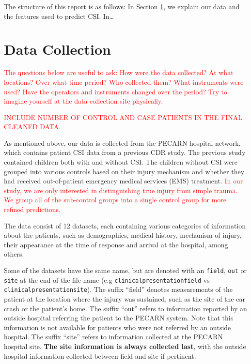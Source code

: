 \documentclass[
]{article}
\begin{document}
The structure of this report is as follows: In Section
\textcolor{blue}{\ref{sec:data}}, we explain our data and the features
used to predict CSI. In\ldots{}

\hypertarget{sec:data}{%
\section{Data Collection}\label{sec:data}}

\textcolor{red}{The questions below are useful to ask: How were the data collected? At what locations? Over what time period? Who collected them? What instruments were used? Have the operators and instruments changed over the period? Try to imagine yourself at the data collection site physically.}

\textcolor{red}{INCLUDE NUMBER OF CONTROL AND CASE PATIENTS IN THE FINAL CLEANED DATA.}

As mentioned above, our data is collected from the PECARN hospital
network, which contains patient CSI data from a previous CDR study. The
previous study contained children both with and without CSI. The
children without CSI were grouped into various controls based on their
injury mechanism and whether they had received out-of-patient emergency
medical services (EMS) treatment.
\textcolor{red}{In our study, we are only interested in distinguishing true injury from simple trauma. We group all of the sub-control groups into a single control group for more refined predictions.}

The data consist of 12 datasets, each containing various categories of
information about the patients, such as demographics, medical history,
mechanism of injury, their appearance at the time of response and
arrival at the hospital, among others.

Some of the datasets have the same name, but are denoted with an
\texttt{field}, \texttt{out} or \texttt{site} at the end of the file
name (e.g \texttt{clinicalpresentationfield} vs
\texttt{clinicalpresentationsite}). The suffix ``field'' denotes
measurements of the patient at the location where the injury was
sustained, such as the site of the car crash or the patient's home. The
suffix ``out'' refers to information reported by an outside hospital
referring the patient to the PECARN system. Note that this information
is not available for patients who were not referred by an outside
hospital. The suffix ``site'' refers to information collected at the
PECARN hospital site. \textbf{The site information is always collected
last}, with the outside hospital information collected between field and
site if pertinent.
\end{document}
